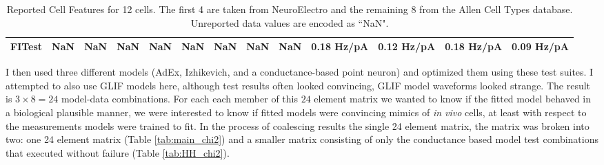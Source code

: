 \begin{table}
{\begin{tabular}{lllllllllllll}
FITest                         &                            NaN &                      NaN &                                NaN &          NaN &            NaN &            NaN &            NaN &            NaN &  0.18 Hz/pA &  0.12 Hz/pA &  0.18 Hz/pA &  0.09 Hz/pA \\
\bottomrule
\end{tabular}}
\caption[Reported Cell Features]{Reported Cell Features for 12 cells.
The first 4 are taken from NeuroElectro and the remaining 8 from the Allen Cell Types database.
Unreported data values are encoded as ``NaN".}
\label{table:tests_derived_from_reports}
\end{table}

I then used three different models (AdEx, Izhikevich, and a conductance-based point neuron) and optimized them using these test suites. I attempted to also use GLIF models here, although test results often looked convincing, GLIF model waveforms looked strange.
The result is $3 \times 8 = 24$ model-data combinations.
For each each member of this $24$ element matrix we wanted to know if the fitted model behaved in a biological plausible manner, we were interested to know if fitted models were convincing mimics of \emph{in vivo} cells, at least with respect to the measurements models were trained to fit.
In the process of coalescing results the single 24 element matrix, the matrix was broken into two: one 24 element matrix (Table \ref{tab:main_chi2})
and a smaller matrix consisting of only the conductance based model test combinations that executed without failure (Table \ref{tab:HH_chi2}).

